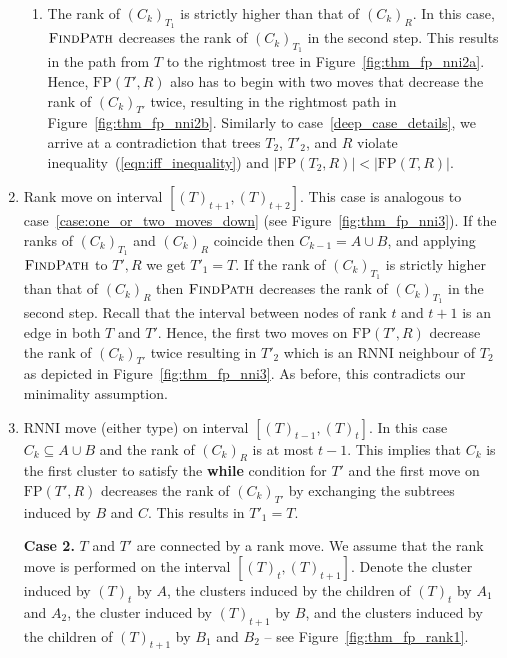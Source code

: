 \documentclass[11pt]{amsart}
\newcommand{\rnni}{\mathrm{RNNI}}
\newcommand{\findpath}{\textsc{FindPath}}
\newcommand{\fp}{\mathrm{FP}}
\begin{document}
\begin{enumerate}[label = 1.{\arabic*}]
\begin{enumerate}[label = \theenumi.\arabic*]
\item The rank of $(C_k)_{T_1}$ is strictly higher than that of $(C_k)_R$.
In this case, $\findpath$ decreases the rank of $(C_k)_{T_1}$ in the second step.
This results in the path from $T$ to the rightmost tree in Figure~\ref{fig:thm_fp_nni2a}.
Hence, $\fp(T', R)$ also has to begin with two moves that decrease the rank of $(C_k)_{T'}$ twice, resulting in the rightmost path in Figure~\ref{fig:thm_fp_nni2b}.
Similarly to case~\ref{deep_case_details}, we arrive at a contradiction that trees $T_2$, $T'_2$, and $R$ violate inequality~(\ref{eqn:iff_inequality}) and $|\fp(T_2,R)| < |\fp(T,R)|$.
\end{enumerate}

\item Rank move on interval $[(T)_{t+1},(T)_{t+2}]$.
\label{case:rank_move_interval_above}
This case is analogous to case~\ref{case:one_or_two_moves_down} (see Figure~\ref{fig:thm_fp_nni3}).
If the ranks of $(C_k)_{T_1}$ and $(C_k)_R$ coincide then $C_{k-1} = A \cup B$, and applying $\findpath$ to $T', R$ we get $T'_1 = T$.
If the rank of $(C_k)_{T_1}$ is strictly higher than that of $(C_k)_R$ then $\findpath$ decreases the rank of $(C_k)_{T_1}$ in the second step.
Recall that the interval between nodes of rank $t$ and $t+1$ is an edge in both $T$ and $T'$.
Hence, the first two moves on $\fp(T', R)$ decrease the rank of $(C_k)_{T'}$ twice resulting in $T'_2$ which is an $\rnni$ neighbour of $T_2$ as depicted in Figure~\ref{fig:thm_fp_nni3}.
As before, this contradicts our minimality assumption.

\item $\rnni$ move (either type) on interval $[(T)_{t-1},(T)_t]$.
In this case $C_k \subseteq A \cup B$ and the rank of $(C_k)_{R}$ is at most $t - 1$.
This implies that $C_k$ is the first cluster to satisfy the \textbf{while} condition for $T'$ and the first move on $\fp(T', R)$ decreases the rank of $(C_k)_{T'}$ by exchanging the subtrees induced by $B$ and $C$.
This results in $T'_1 = T$.
\end{enumerate}

\begin{enumerate}
\item[\textbf{Case 2.}] $T$ and $T'$ are connected by a rank move.
We assume that the rank move is performed on the interval $[(T)_t, (T)_{t+1}]$.
Denote the cluster induced by $(T)_t$ by $A$, the clusters induced by the children of $(T)_t$ by $A_1$ and $A_2$, the cluster induced by $(T)_{t+1}$ by $B$, and the clusters induced by the children of $(T)_{t+1}$ by $B_1$ and $B_2$ -- see Figure~\ref{fig:thm_fp_rank1}.
\end{enumerate}
\end{document}
